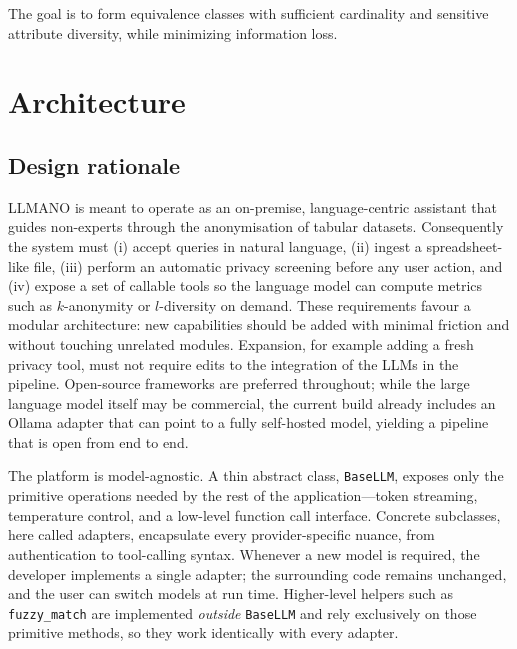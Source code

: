 \documentclass{article}
\begin{document}
The goal is to form equivalence classes with sufficient cardinality and sensitive attribute diversity, while minimizing information loss.

\section{Architecture}
\label{sec:architecture}

\subsection{Design rationale}

LLMANO is meant to operate as an on-premise, language-centric assistant that guides non-experts through the anonymisation of tabular datasets.  Consequently the system must (i) accept queries in natural language, (ii) ingest a spreadsheet-like file, (iii) perform an automatic privacy screening before any user action, and (iv) expose a set of callable tools so the language model can compute metrics such as $k$-anonymity or $l$-diversity on demand.  These requirements favour a modular architecture: new capabilities should be added with minimal friction and without touching unrelated modules.  Expansion, for example adding a fresh privacy tool, must not require edits to the integration of the LLMs in the pipeline.  Open-source frameworks are preferred throughout; while the large language model itself may be commercial, the current build already includes an Ollama adapter that can point to a fully self-hosted model, yielding a pipeline that is open from end to end.

The platform is model-agnostic.  A thin abstract class, \texttt{BaseLLM}, exposes only the primitive operations needed by the rest of the application—token streaming, temperature control, and a low-level function call interface.  Concrete subclasses, here called adapters, encapsulate every provider-specific nuance, from authentication to tool-calling syntax.  Whenever a new model is required, the developer implements a single adapter; the surrounding code remains unchanged, and the user can switch models at run time.  Higher-level helpers such as \texttt{fuzzy\_match} are implemented \emph{outside} \texttt{BaseLLM} and rely exclusively on those primitive methods, so they work identically with every adapter.
\end{document}
